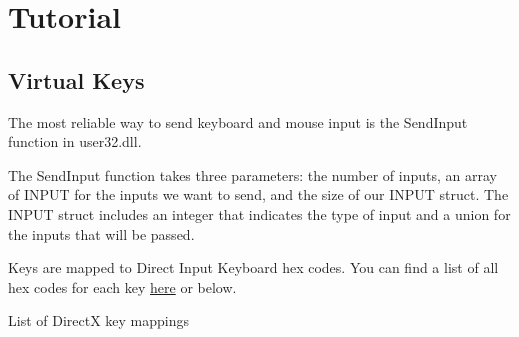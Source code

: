 \documentclass[
  openany]{book}
\begin{document}
\hypertarget{tutorial-7}{%
\section*{Tutorial}\label{tutorial-7}}

\hypertarget{virtual-keys}{%
\subsection*{Virtual Keys}\label{virtual-keys}}

The most reliable way to send keyboard and mouse input is the SendInput function in user32.dll.

The SendInput function takes three parameters: the number of inputs, an array of INPUT for the inputs we want to send, and the size of our INPUT struct. The INPUT struct includes an integer that indicates the type of input and a union for the inputs that will be passed.

Keys are mapped to Direct Input Keyboard hex codes. You can find a list of all hex codes for each key \href{http://www.flint.jp/misc/?q=dik\&lang=en}{here} or below.

List of DirectX key mappings
\end{document}
